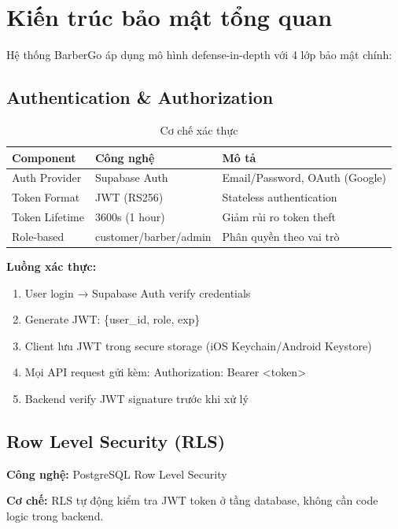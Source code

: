 
\section{Kiến trúc bảo mật tổng quan}

Hệ thống BarberGo áp dụng mô hình defense-in-depth với 4 lớp bảo mật chính:

\subsection{Authentication \& Authorization}

\begin{table}[H]
\centering
\caption{Cơ chế xác thực}
\begin{tabular}{|l|l|p{6cm}|}
\hline
\textbf{Component} & \textbf{Công nghệ} & \textbf{Mô tả} \\
\hline
Auth Provider & Supabase Auth & Email/Password, OAuth (Google) \\
\hline
Token Format & JWT (RS256) & Stateless authentication \\
\hline
Token Lifetime & 3600s (1 hour) & Giảm rủi ro token theft \\
\hline
Role-based & customer/barber/admin & Phân quyền theo vai trò \\
\hline
\end{tabular}
\end{table}

\textbf{Luồng xác thực:}
\begin{enumerate}
    \item User login → Supabase Auth verify credentials
    \item Generate JWT: \{user\_id, role, exp\}
    \item Client lưu JWT trong secure storage (iOS Keychain/Android Keystore)
    \item Mọi API request gửi kèm: Authorization: Bearer <token>
    \item Backend verify JWT signature trước khi xử lý
\end{enumerate}

\subsection{Row Level Security (RLS)}

\textbf{Công nghệ:} PostgreSQL Row Level Security

\textbf{Cơ chế:} RLS tự động kiểm tra JWT token ở tầng database, không cần code logic trong backend.

